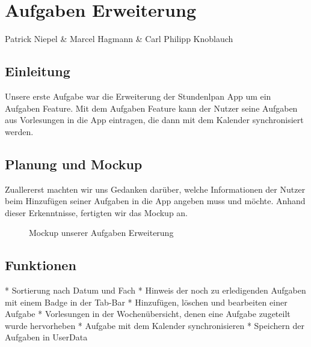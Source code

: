 \chapter{Aufgaben Erweiterung}
Patrick Niepel \& Marcel Hagmann \& Carl Philipp Knoblauch

\section{Einleitung}
Unsere erste Aufgabe war die Erweiterung der Stundenlpan App um ein Aufgaben Feature. Mit dem Aufgaben Feature kann der Nutzer seine Aufgaben aus Vorlesungen in die App eintragen, die dann mit dem Kalender synchronisiert werden.

\newpage
\section{Planung und Mockup}

Zuallererst machten wir uns Gedanken darüber, welche Informationen der Nutzer beim Hinzufügen seiner Aufgaben in die App angeben muss und möchte. Anhand dieser Erkenntnisse, fertigten wir das Mockup an.


\begin{figure}[ht]
	\centering
	\caption{Mockup unserer Aufgaben Erweiterung}
	\label{fig1}
\end{figure}

\newpage
\section{Funktionen}
* Sortierung nach Datum und Fach
* Hinweis der noch zu erledigenden Aufgaben mit einem Badge in der Tab-Bar
* Hinzufügen, löschen und bearbeiten einer Aufgabe
* Vorlesungen in der Wochenübersicht, denen eine Aufgabe zugeteilt wurde hervorheben
* Aufgabe mit dem Kalender synchronisieren
* Speichern der Aufgaben in UserData


